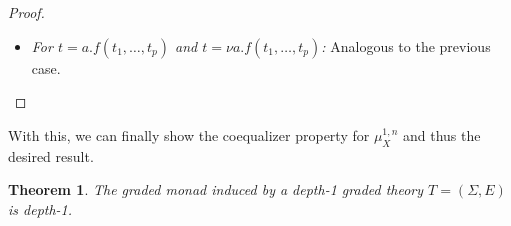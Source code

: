 \documentclass[11pt,a4paper]{amsart}
\newtheorem{theorem}{Theorem}[section]
\newcommand{\sig}{\Sigma}
\theoremstyle{plain}
\numberwithin{equation}{section}
\newcommand{\+}[1]{\mathcal{#1}\xspace}
\theoremstyle{definition}
\begin{document}
\begin{proof}
\begin{enumerate}[wide]
\begin{itemize}
                    For \(d(f) = 1\), we have
                    \begin{align*}
                        &q([s^n_X(t\sigma)]_1) \\
                        =~&q([s^n_X(f(t_1\sigma, \ldots, t_p\sigma))]_1) && \text{definition} \\
                        =~&q([f([t_1\sigma]_n, \ldots, [t_p\sigma]_n)]_1) && \text{definition of } s^n_X \\
                        =~&q([f(\mu^{0, n}_X([t_1 \bar{\sigma}]_0), \ldots, \mu^{0, n}_X([t_p \bar{\sigma}]_0)]))]_1) && \text{\cref{thm:multiplicationsubstitution}} \\
                        =~&q([f(t_1 \bar{\sigma}, \ldots, t_p \bar{\sigma})]_1) && \text{\eqref{itm:coequalizerpropertiesdepth1}} \\
                        =~&q([t\bar{\sigma}]_1) && \text{definition}.
                    \end{align*}
                \item
                    \textit{For \(t = a.f(t_1, \ldots, t_p)\) and \(t = \nu a.f(t_1, \ldots, t_p)\):}
                    Analogous to the previous case.
            \end{itemize}
    \end{enumerate}

\end{proof}

With this, we can finally show the coequalizer property for \(\mu^{1, n}_X\) and thus the desired result.

\begin{theorem}
    The graded monad induced by a depth-1 graded theory \(T = (\sig, E)\) is depth-1.
\end{theorem}
\end{document}
